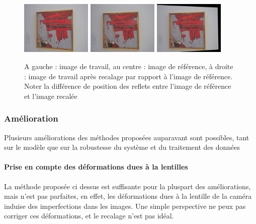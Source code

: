 \documentclass[12pt,a4paper]{article}
\begin{document}
\begin{figure}[H]
  \centering
  \includegraphics[width=0.30\textwidth]{Fig/working.png}
  \includegraphics[width=0.30\textwidth]{Fig/reference_image.png}
  \includegraphics[width=0.30\textwidth]{Fig/fitted.png}

  \caption{A gauche : image de travail, au centre : image de référence, à droite : image de travail après recalage par rapport à l'image de référence. Noter la différence de position des reflets entre l'image de référence et l'image recalée}
\end{figure}

\subsubsection{Amélioration}

Plusieurs améliorations des méthodes proposées auparavant sont possibles, tant sur le modèle que sur la robustesse du système et du traitement des données

\paragraph{Prise en compte des déformations dues à la lentilles}
La méthode proposée ci dessus est suffisante pour la pluspart des améliorations, mais n'est pas parfaites, en effet, les déformations dues à la lentille de la caméra induise des imperfections dans les images. Une simple perspective ne peux pas corriger ces déformations, et le recalage n'est pas idéal.
\end{document}
